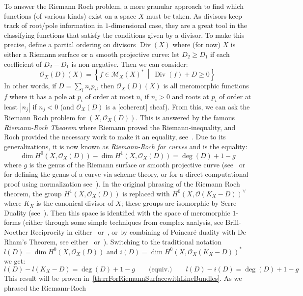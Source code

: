 \documentclass{ut-thesis}
\newcommand{\CM}{{\mathcal{M}}}
\newcommand{\CO}{{\mathcal{O}}}
\renewcommand{\deg}{{\operatorname{deg}}}
\renewcommand{\div}{{\operatorname{Div}}}
\newcommand{\set}[2]{\left\{#1 \ \middle|\ #2\right\}}
\begin{document}
To answer the Riemann Roch problem, a more granular approach to find which functions (of various kinds) exist
on a space $X$ must be taken. As divisors keep track of root/pole information in $1$-dimensional case, they
are a great tool in the classifying functions that satisfy the conditions given by a divisor. To make
this precise, define a partial ordering on divisors $\div(X)$ where (for now) $X$ is either a Riemann surface
or a smooth projective curve: let $D_2 \ge D_1$ if each coefficient of $D_2 - D_1$ is non-negative. Then we
can consider:
\[
  \CO_X(D)(X) = \set{f \in \CM_X(X)^*}{\div(f) + D \ge 0}
\]
In other words, if $D =\sum_i n_ip_i$, then $\CO_X(D)(X)$ is all meromorphic functions $f$ where it has a pole
at $p_i$ of order at most $n_i$ if $n_i > 0$ and roots at $p_i$ of order at least $|n_j|$ if $n_j < 0$ (and
$\CO_X(D)$ is a [coherent] sheaf). From this, we can ask the Riemann Roch problem for $(X, \CO_X(D))$. This is
answered by the famous \emph{Riemann-Roch Theorem} where Riemann proved the Riemann-inequality, and Roch
provided the necessary work to make it an equality, see~\cite{a.griffithsIntroductionAlgebraicCurves}. Due to
its generalizations, it is now known as \emph{Riemann-Roch for curves} and is the equality:
\begin{equation}\label{eq:riemannRoch1dIntro}
  \dim H^0(X, \CO_X(D)) - \dim H^1(X, \CO_X(D)) = \deg(D)+1-g
\end{equation}
where $g$ is the genus of the Riemann surface or smooth projective curve
(see~\cite{hartshorneAlgebraicGeometry2013} or~\cite{NateAlgGeo} for defining the genus of a curve via scheme
theory, or for a
direct computational proof using normalization see~\cite{NateComplexAnalysis}). In the original phrasing of the Riemann Roch
theorem, the group $H^1(X, \CO_X(D))$ is replaced with $H^0(X, \CO(K_X-D))^\vee$ where $K_X$ is the canonical
divisor of $X$; these groups are isomorphic by Serre Duality (see~\cite[section~6.3]{NateAlgGeo}). Then this
space is identified with the space of meromorphic $1$-forms (either through some simple techniques from
complex analysis, see Brill-Noether Reciprocity in either~\cite{a.griffithsIntroductionAlgebraicCurves}
or~\cite{NateComplexAnalysis}, or by combining of Poincar\'e duality with De Rham's Theorem, see
either~\cite{leeIntroductionRiemannianManifolds2018} or~\cite{NateDiffGeo}). Switching to the traditional
notation $l(D) = \dim H^0(X, \CO_X(D))$ and $i(D) = \dim H^0(X, \CO_X(K_X-D))^*$ we get:
\[
  l(D) - l(K_X-D) = \deg(D) + 1-g \qquad \text{(equiv.)} \qquad l(D) - i(D) = \deg(D) + 1-g
\]
This result will be proven in~\cref{th:rrForRiemannSurfacewithLineBundles}. As we phrased the Riemann-Roch
\end{document}

